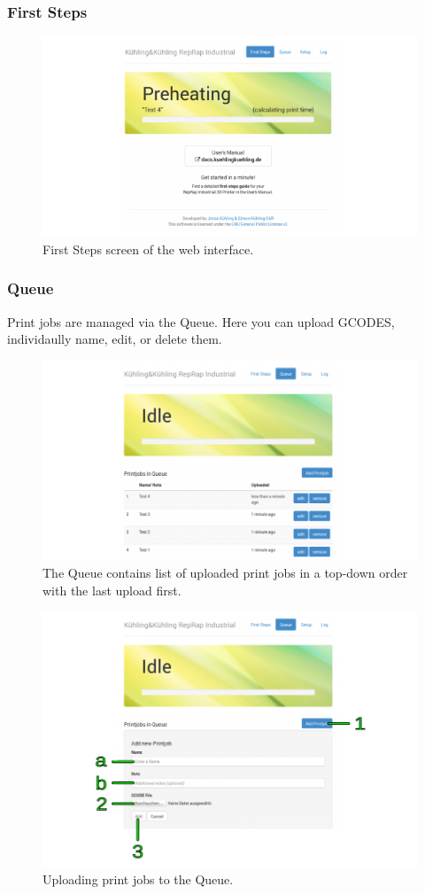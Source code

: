 \subsubsection{First Steps}

\begin{figure}[H]
  \centering
  \includegraphics[width=.7\linewidth]{./img/wi_firststeps_printstarted.png}
  \caption{First Steps screen of the web interface.}
\end{figure}

\subsubsection{Queue}

Print jobs are managed via the Queue. Here you can upload GCODES, individaully name, edit, or delete them. 

\begin{figure}[H]
  \centering
  \includegraphics[width=.7\linewidth]{./img/wi_queue_1.png}
  \caption{The Queue contains list of uploaded print jobs in a top-down order with 
           the last upload first.}
\end{figure}

\begin{figure}[H]
  \centering
  \includegraphics[width=.7\linewidth]{./img/wi_queue_2.png}
  \caption{Uploading print jobs to the Queue.}
\end{figure}

